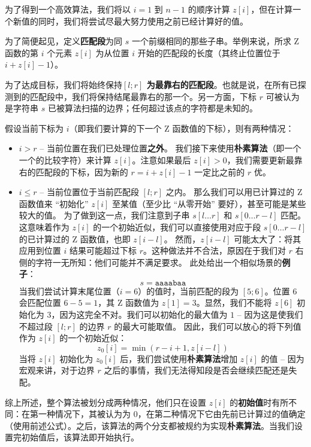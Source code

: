 为了得到一个高效算法，我们将以 $i = 1$ 到 $n - 1$ 的顺序计算 $z[i]$，但在计算一个新值的同时，我们将尝试尽最大努力使用之前已经计算好的值。

为了简便起见，定义\textbf{匹配段}为同 $s$ 一个前缀相同的那些子串。举例来说，所求 Z 函数的第 $i$ 个元素 $z[i]$ 为从位置 $i$ 开始的匹配段的长度（其终止位置位于 $i + z[i] - 1$）。

为了达成目标，我们将始终保持\textbf{$[l;r]$  为最靠右的匹配段}。也就是说，在所有已探测到的匹配段中，我们将保持结尾最靠右的那一个。另一方面，下标 $r$ 可被认为是字符串 $s$ 已被算法扫描的边界；任何超过该点的字符都是未知的。

假设当前下标为 $i$（即我们要计算的下一个 Z 函数值的下标），则有两种情况：

\begin{itemize}
\item $i > r$ -- 当前位置在我们已处理位置\textbf{之外}。
我们接下来使用\textbf{朴素算法}（即一个一个的比较字符）来计算 $z[i]$。注意如果最后 $z[i] > 0$，我们需要更新最靠右的匹配段的下标，因为新的 $r = i + z[i] - 1$ 一定比之前的 $r$ 优。
\item $i \le r$ -- 当前位置位于当前匹配段 $[l;r]$ 之内。
那么我们可以用已计算过的 Z 函数值来 “初始化” $z[i]$ 至某值（至少比 “从零开始” 要好），甚至可能是某些较大的值。
为了做到这一点，我们注意到子串 $s[l\dots r]$ 和 $s[0 \dots r - l]$ 匹配。这意味着作为 $z[i]$ 的一个初始近似，我们可以直接使用对应于段 $s[0 \dots r - l]$ 的已计算过的 Z 函数值，也即 $z[i - l]$。
然而，$z[i - l]$ 可能太大了：将其应用到位置 $i$ 结果可能超过下标 $r$。这种做法并不合法，原因在于我们对 $r$ 右侧的字符一无所知：他们可能并不满足要求。
此处给出一个相似场景的\textbf{例子}：
$$
s=\mathtt{aaaabaa}
$$
当我们尝试计算末尾位置（$i = 6$）的值时，当前匹配的段为 $[5;6]$。位置 $6$ 会匹配位置 $6 - 5 = 1$，其 Z 函数值为 $z[1] = 3$。显然，我们不能将 $z[6]$ 初始化为 $3$，因为这完全不对。我们可以初始化的最大值为 $1$ -- 因为这是使我们不超过段 $[l;r]$ 的边界 $r$ 的最大可能取值。
因此，我们可以放心的将下列值作为 $z[i]$ 的一个初始近似：
$$
z_0[i] = \min(r - i + 1, z[i - l])
$$
当将 $z[i]$ 初始化为 $z_0[i]$ 后，我们尝试使用\textbf{朴素算法}增加 $z[i]$ 的值 -- 因为宏观来讲，对于边界 $r$ 之后的事情，我们无法得知段是否会继续匹配还是失配。
\end{itemize}

综上所述，整个算法被划分成两种情况，他们只在设置 $z[i]$ 的\textbf{初始值}时有所不同：在第一种情况下，其被认为为 $0$，在第二种情况下它由先前已计算过的值确定（使用前述公式）。之后，该算法的两个分支都被规约为实现\textbf{朴素算法}。当我们设置完初始值后，该算法即开始执行。

